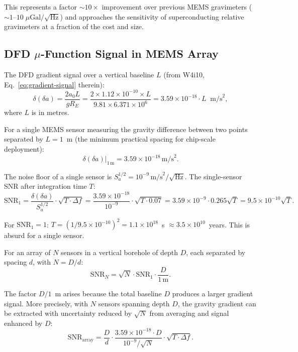 \documentclass[11pt]{article}
\theoremstyle{definition}
\theoremstyle{remark}
\newcommand{\ee}[1]{\times10^{#1}}
\newcommand{\SNR}{\mathrm{SNR}}
\newcommand{\azero}{a_0}
\begin{document}
This represents a factor $\sim 10\times$ improvement over
previous MEMS gravimeters ($\sim 1$--$10\;\mu\mathrm{Gal}/\sqrt{\mathrm{Hz}}$)
and approaches the sensitivity of superconducting relative gravimeters
at a fraction of the cost and size.

\subsection{DFD $\mu$-Function Signal in MEMS Array}

The DFD gradient signal over a vertical baseline $L$ (from W4i10,
Eq.~\ref{eq:gradient-signal} therein):
\begin{equation}
\delta(\delta a) = \frac{2\azero L}{g R_E}
= \frac{2 \times 1.12\ee{-10} \times L}{9.81 \times 6.371\ee{6}}
= 3.59\ee{-18} \cdot L \;\;\mathrm{m/s}^2,
\end{equation}
where $L$ is in metres.

For a single MEMS sensor measuring the gravity difference between
two points separated by $L = 1$~m (the minimum practical spacing
for chip-scale deployment):
\begin{equation}
\delta(\delta a)|_{1\,\mathrm{m}} = 3.59\ee{-18}\,\mathrm{m/s}^2.
\end{equation}

The noise floor of a single sensor is $S_a^{1/2} = 10^{-9}\,\mathrm{m/s}^2/\sqrt{\mathrm{Hz}}$.
The single-sensor SNR after integration time $T$:
\begin{equation}
\SNR_1 = \frac{\delta(\delta a)}{S_a^{1/2}} \cdot \sqrt{T \cdot \Delta f}
= \frac{3.59\ee{-18}}{10^{-9}} \cdot \sqrt{T \cdot 0.07}
= 3.59\ee{-9} \cdot 0.265 \sqrt{T}
= 9.5\ee{-10} \sqrt{T}.
\end{equation}

For $\SNR_1 = 1$: $T = (1/9.5\ee{-10})^2 = 1.1\ee{18}$~s $\approx 3.5\ee{10}$~years.
This is absurd for a single sensor.

For an array of $N$ sensors in a vertical borehole of depth $D$,
each separated by spacing $d$, with $N = D/d$:
\begin{equation}
\SNR_N = \sqrt{N} \cdot \SNR_1 \cdot \frac{D}{1\,\mathrm{m}}.
\end{equation}

The factor $D/1$~m arises because the total baseline $D$ produces
a larger gradient signal. More precisely, with $N$ sensors spanning
depth $D$, the gravity gradient can be extracted with uncertainty
reduced by $\sqrt{N}$ from averaging and signal enhanced by $D$:
\begin{equation}
\SNR_{\mathrm{array}} = \frac{D}{d} \cdot \frac{3.59\ee{-18} \cdot D}{10^{-9}/\sqrt{N}}
\cdot \sqrt{T \cdot \Delta f}.
\end{equation}
\end{document}
